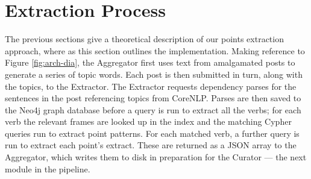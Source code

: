   \section{Extraction Process}
    The previous sections give a theoretical description of our points extraction approach, where as this section outlines the implementation. Making reference to Figure \ref{fig:arch-dia}, the Aggregator first uses text from amalgamated posts to generate a series of topic words. Each post is then submitted in turn, along with the topics, to the Extractor. The Extractor requests dependency parses for the sentences in the post referencing topics from CoreNLP. Parses are then saved to the Neo4j graph database before a query is run to extract all the verbs; for each verb the relevant frames are looked up in the index and the matching Cypher queries run to extract point patterns. For each matched verb, a further query is run to extract each point's extract. These are returned as a JSON array to the Aggregator, which writes them to disk in preparation for the Curator --- the next module in the pipeline.
